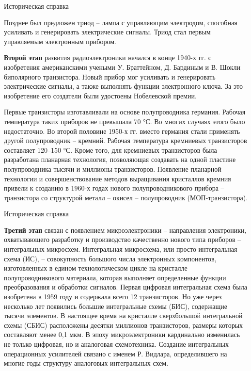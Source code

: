 \documentclass[12pt, pdf, hyperref={unicode},handout]{beamer}
\begin{document}
\begin{frame}{Историческая справка}
  \begin{block}

    \small{
      Позднее был предложен триод – лампа с управляющим электродом, способная усиливать и генерировать электрические сигналы. Триод стал первым управляемым электронным прибором.

      \textbf{Второй этап} развития радиоэлектроники начался в конце 1940-х гг. с изобретения американскими учеными У. Браттейном, Д. Бардиным и В. Шокли биполярного транзистора. Новый прибор мог усиливать и генерировать электрические сигналы, а также выполнять функции электронного ключа. За это изобретение его создатели были удостоены Нобелевской премии.

Первые транзисторы изготавливали на основе полупроводника германия. Рабочая температура таких приборов не превышала 70 °С. Во многих случаях этого было недостаточно. Во второй половине 1950-х гг. вместо германия стали применять другой полупроводник – кремний. Рабочая температура кремниевых транзисторов составляет 120–150 °С. Кроме того, для кремниевых транзисторов была разработана планарная технология, позволяющая создавать на одной пластине полупроводника тысячи и миллионы транзисторов.
Появление планарной технологии и совершенствование методов выращивания кристаллов кремния привели к созданию в 1960-х годах нового полупроводникового прибора – транзистора со структурой металл – окисел – полупроводник (МОП-транзистора).
}

  \end{block}
  
\end{frame}

\begin{frame}{Историческая справка}
  \begin{block}

    \small{
\textbf{Третий этап} связан с появлением микроэлектроники – направления электроники, охватывающего разработку и производство качественно нового типа приборов – интегральных микросхем. Интегральная микросхема, или просто интегральная схема (ИС), – совокупность большого числа электронных компонентов, изготовленных в едином технологическом цикле на кристалле полупроводникового материала, которая выполняет определенные функции преобразования и обработки сигналов.
Первая цифровая интегральная схема была изобретена в 1959 году и содержала всего 12 транзисторов. Но уже через несколько лет появились большие интегральные схемы (БИС), содержащие тысячи элементов. В настоящее время на кристалле сверхбольшой интегральной схемы (СБИС) расположены десятки миллионов транзисторов, размеры которых составляют менее 0,1 мкм.
В эпоху микроэлектроники кардинально изменилась не только цифровая, но и аналоговая схемотехника. Создание интегральных операционных усилителей связано с именем Р. Видлара, определившего на многие годы структуру аналоговых интегральных схем.
}

  \end{block}
  
\end{frame}
\end{document}
